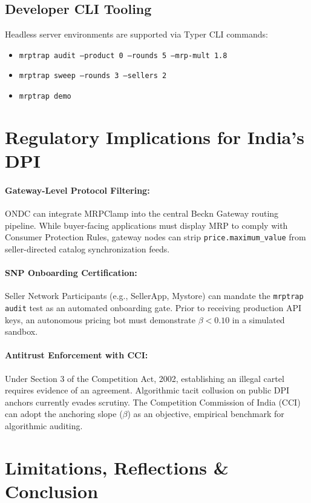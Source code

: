 \documentclass[11pt,a4paper]{article}
\begin{document}
\subsection{Developer CLI Tooling}
Headless server environments are supported via Typer CLI commands:
\begin{itemize}[leftmargin=*]
    \item \texttt{mrptrap audit --product 0 --rounds 5 --mrp-mult 1.8}
    \item \texttt{mrptrap sweep --rounds 3 --sellers 2}
    \item \texttt{mrptrap demo}
\end{itemize}

\section{Regulatory Implications for India's DPI}

\paragraph{Gateway-Level Protocol Filtering:} ONDC can integrate MRPClamp into the central Beckn Gateway routing pipeline. While buyer-facing applications must display MRP to comply with Consumer Protection Rules, gateway nodes can strip \texttt{price.maximum\_value} from seller-directed catalog synchronization feeds.

\paragraph{SNP Onboarding Certification:} Seller Network Participants (e.g., SellerApp, Mystore) can mandate the \texttt{mrptrap audit} test as an automated onboarding gate. Prior to receiving production API keys, an autonomous pricing bot must demonstrate $\beta < 0.10$ in a simulated sandbox.

\paragraph{Antitrust Enforcement with CCI:} Under Section 3 of the Competition Act, 2002, establishing an illegal cartel requires evidence of an agreement. Algorithmic tacit collusion on public DPI anchors currently evades scrutiny. The Competition Commission of India (CCI) can adopt the anchoring slope ($\beta$) as an objective, empirical benchmark for algorithmic auditing.

\section{Limitations, Reflections \& Conclusion}
\end{document}
